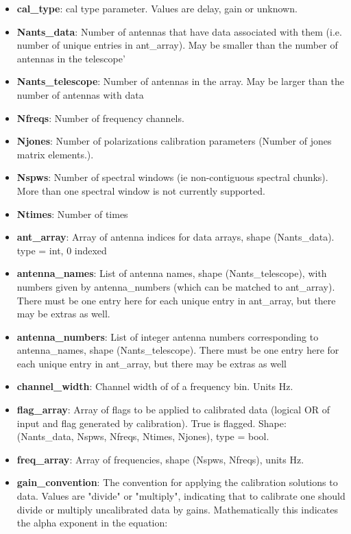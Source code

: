 \documentclass[11pt, oneside]{article}   	%
\begin{document}
\begin{itemize}
\item{\textbf{cal\_type}: cal type parameter. Values are delay, gain or
    unknown.}
\item{\textbf{Nants\_data}: Number of antennas that have data associated with them 
    (i.e. number of unique entries in ant_array). May be smaller than the number of 
    antennas in the telescope'}
\item{\textbf{Nants\_telescope}: Number of antennas in the array. May be larger
    than the number of antennas with data}
\item{\textbf{Nfreqs}: Number of frequency channels.}
\item{\textbf{Njones}: Number of polarizations calibration parameters (Number of
    jones matrix elements.).}
\item{\textbf{Nspws}: Number of spectral windows (ie non-contiguous spectral
    chunks). More than one spectral window is not currently supported.}
\item{\textbf{Ntimes}: Number of times}
\item{\textbf{ant\_array}: Array of antenna indices for data arrays, shape
    (Nants\_data). type = int, 0 indexed}
\item{\textbf{antenna\_names}: List of antenna names, shape (Nants\_telescope),
    with numbers given by antenna\_numbers (which can be matched to ant\_array).
    There must be one entry here for each unique entry in ant\_array, but there may be extras as well.}
\item{\textbf{antenna\_numbers}: List of integer antenna numbers corresponding
    to antenna\_names, shape (Nants\_telescope). There must be one entry here for each unique entry 
    in ant_array, but there may be extras as well}
\item{\textbf{channel\_width}: Channel width of of a frequency bin. Units Hz.}
\item{\textbf{flag\_array}: Array of flags to be applied to calibrated data
    (logical OR of input and flag generated by calibration). True is
    flagged. Shape: (Nants\_data, Nspws, Nfreqs, Ntimes, Njones), type = bool.}
\item{\textbf{freq\_array}: Array of frequencies, shape (Nspws, Nfreqs), units
    Hz.}
\item{\textbf{gain\_convention}: The convention for applying the calibration solutions to data.
    Values are "divide" or "multiply", indicating that to calibrate one should divide or multiply
    uncalibrated data by gains. Mathematically this indicates the alpha exponent in the equation: 
}
\end{itemize}
\end{document}
